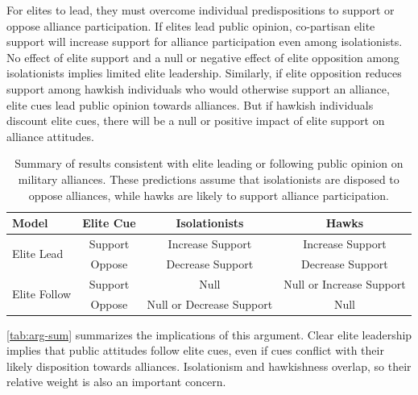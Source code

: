 \documentclass[12pt]{article}
\begin{document}
For elites to lead, they must overcome individual predispositions to support or oppose alliance participation. 
If elites lead public opinion, co-partisan elite support will increase support for alliance participation even among isolationists. 
No effect of elite support and a null or negative effect of elite opposition among isolationists implies limited elite leadership. 
Similarly, if elite opposition reduces support among hawkish individuals who would otherwise support an alliance, elite cues lead public opinion towards alliances. 
But if hawkish individuals discount elite cues, there will be a null or positive impact of elite support on alliance attitudes. 


\begin{table}[hbt!]
\begin{center}
\begin{tabular}{lccc}
   Model  & Elite Cue & Isolationists & Hawks  \\
\hline
\multirow{2}{*}{Elite Lead} & Support   & Increase Support  &  Increase Support \\
                            & Oppose    & Decrease Support  &  Decrease Support \\

 \hline
\multirow{2}{*}{Elite Follow} & Support   & Null  & Null or Increase Support \\
                              & Oppose    & Null or Decrease Support   &  Null \\
\hline
\end{tabular}
\caption{Summary of results consistent with elite leading or following public opinion on military alliances. These predictions assume that isolationists are disposed to oppose alliances, while hawks are likely to support alliance participation.}
\label{tab:arg-sum}
\end{center} 
\end{table}


\autoref{tab:arg-sum} summarizes the implications of this argument.  
Clear elite leadership implies that public attitudes follow elite cues, even if cues conflict with their likely disposition towards alliances. 
Isolationism and hawkishness overlap, so their relative weight is also an important concern.
\end{document}

